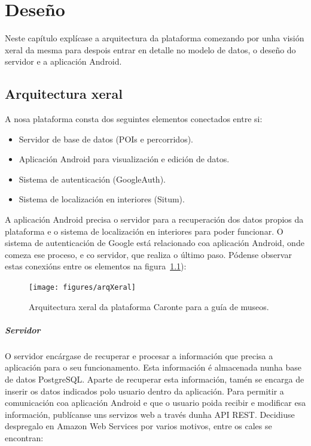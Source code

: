\chapter{Deseño}
Neste capítulo explícase a arquitectura da plataforma comezando por unha visión xeral da mesma para despois entrar en detalle no modelo de datos, o deseño do servidor e a aplicación Android.


\section{Arquitectura xeral}

A nosa plataforma consta dos seguintes elementos conectados entre si:
\begin{itemize}
	\item Servidor de base de datos (POIs e percorridos).
	\item Aplicación Android para visualización e edición de datos.
	\item Sistema de autenticación (GoogleAuth).
	\item Sistema de localización en interiores (Situm).
\end{itemize}

A aplicación Android precisa o servidor para a recuperación dos datos propios da plataforma e o sistema de localización en interiores para poder funcionar. O sistema de autenticación de Google está relacionado coa aplicación Android, onde comeza ese proceso, e co servidor, que realiza o último paso. Pódense observar estas conexións entre os elementos na figura~\ref{fig:arq_xeral}):


\begin{figure}[tbh] 
	\begin{center}
		\texttt{[image: figures/arqXeral]}
		\caption{Arquitectura xeral da plataforma Caronte para a guía de museos.}
		\label{fig:arq_xeral}
	\end{center}
\end{figure}

\paragraph{Servidor}
O servidor encárgase de recuperar e procesar a información que precisa a aplicación para o seu funcionamento. Esta información é almacenada nunha base de datos PostgreSQL. Aparte de recuperar esta información, tamén se encarga de inserir os datos indicados polo usuario dentro da aplicación. Para permitir a comunicación coa aplicación Android e que o usuario poida recibir e modificar esa información, publícanse uns servizos web a través dunha API REST. Decidiuse despregalo en Amazon Web Services por varios motivos, entre os cales se encontran:

